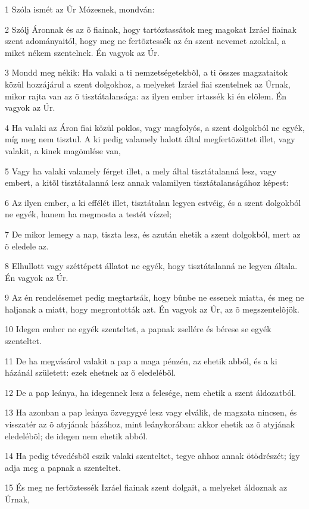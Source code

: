 \par 1 Szóla ismét az Úr Mózesnek, mondván:
\par 2 Szólj Áronnak és az õ fiainak, hogy tartóztassátok meg magokat Izráel fiainak szent adományaitól, hogy meg ne fertõztessék az én szent nevemet azokkal, a miket nékem szentelnek. Én vagyok az Úr.
\par 3 Mondd meg nékik: Ha valaki a ti nemzetségetekbõl, a ti összes magzataitok közül hozzájárul a szent dolgokhoz, a melyeket Izráel fiai szentelnek az Úrnak, mikor rajta van az õ tisztátalansága: az ilyen ember irtassék ki én elõlem. Én vagyok az Úr.
\par 4 Ha valaki az Áron fiai közül poklos, vagy magfolyós, a szent dolgokból ne egyék, míg meg nem tisztul. A ki pedig valamely halott által megfertõzöttet illet, vagy valakit, a kinek magömlése van,
\par 5 Vagy ha valaki valamely férget illet, a mely által tisztátalanná lesz, vagy embert, a kitõl tisztátalanná lesz annak valamilyen tisztátalanságához képest:
\par 6 Az ilyen ember, a ki effélét illet, tisztátalan legyen estvéig, és a szent dolgokból ne egyék, hanem ha megmosta a testét vízzel;
\par 7 De mikor lemegy a nap, tiszta lesz, és azután ehetik a szent dolgokból, mert az õ eledele az.
\par 8 Elhullott vagy széttépett állatot ne egyék, hogy tisztátalanná ne legyen általa. Én vagyok az Úr.
\par 9 Az én rendelésemet pedig megtartsák, hogy bûnbe ne essenek miatta, és meg ne haljanak a miatt, hogy megrontották azt. Én vagyok az Úr, az õ megszentelõjök.
\par 10 Idegen ember ne egyék szenteltet, a papnak zsellére és bérese se egyék szenteltet.
\par 11 De ha megvásárol valakit a pap a maga pénzén, az ehetik abból, és a ki házánál született: ezek ehetnek az õ eledelébõl.
\par 12 De a pap leánya, ha idegennek lesz a felesége, nem ehetik a szent áldozatból.
\par 13 Ha azonban a pap leánya özvegygyé lesz vagy elválik, de magzata nincsen, és visszatér az õ atyjának házához, mint leánykorában: akkor ehetik az õ atyjának eledelébõl; de idegen nem ehetik abból.
\par 14 Ha pedig tévedésbõl eszik valaki szenteltet, tegye ahhoz annak ötödrészét; így adja meg a papnak a szenteltet.
\par 15 És meg ne fertõztessék Izráel fiainak szent dolgait, a melyeket áldoznak az Úrnak,
